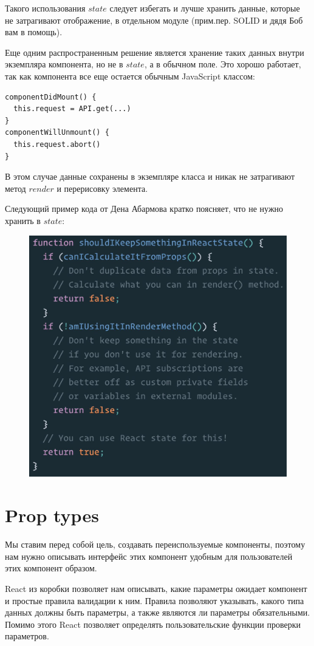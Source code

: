 Такого использования $state$ следует избегать и лучше хранить данные, которые не затрагивают отображение, в отдельном модуле (прим.пер. SOLID и дядя Боб вам в помощь).

Еще одним распространенным решение является хранение таких данных внутри экземпляра компонента, но не в $state$, а в обычном поле. Это хорошо работает, так как компонента все еще остается обычным JavaScript классом:

\begin{lstlisting}
componentDidMount() {
  this.request = API.get(...)
}
componentWillUnmount() {
  this.request.abort()
}
\end{lstlisting}

В этом случае данные сохранены в экземпляре класса и никак не затрагивают метод $render$ и перерисовку элемента.

Следующий пример кода от Дена Абармова кратко поясняет, что не нужно хранить в $state$:

\begin{figure}[h]
	\includegraphics[width=.8\textwidth]{images/dan-cheat-sheet}
\end{figure}


\section{Prop types}

Мы ставим перед собой цель, создавать переиспользуемые компоненты, поэтому нам нужно описывать интерфейс этих компонент удобным для пользователей этих компонент образом.

React из коробки позволяет нам описывать, какие параметры ожидает компонент и простые правила валидации к ним. Правила позволяют указывать, какого типа данных должны быть параметры, а также являются ли параметры обязательными. Помимо этого React позволяет определять пользовательские функции проверки параметров.

